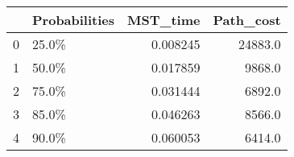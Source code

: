 \begin{tabular}{llrr}
\toprule
{} & Probabilities &  MST\_time &  Path\_cost \\
\midrule
0 &         25.0\% &  0.008245 &    24883.0 \\
1 &         50.0\% &  0.017859 &     9868.0 \\
2 &         75.0\% &  0.031444 &     6892.0 \\
3 &         85.0\% &  0.046263 &     8566.0 \\
4 &         90.0\% &  0.060053 &     6414.0 \\
\bottomrule
\end{tabular}
